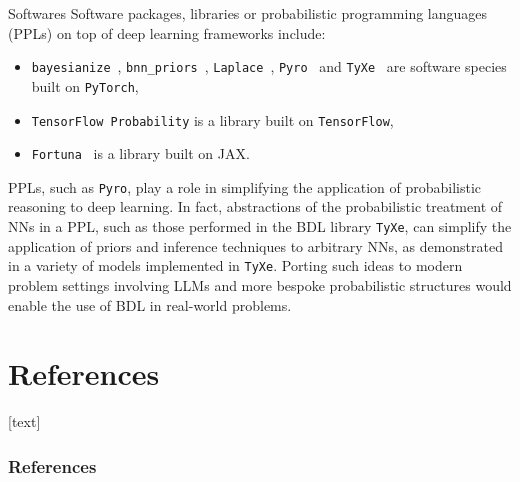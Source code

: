 \documentclass[9pt,handout]{beamer}
\begin{document}

\begin{frame}{Softwares}
Software packages, libraries or probabilistic programming languages (PPLs) on top of deep learning frameworks include:
\begin{itemize}
	\item \texttt{bayesianize}~\citep{ritter2021}, \texttt{bnn\_priors}~\citep{fortuin2021bnnpriors}, \texttt{Laplace}~\citep{daxberger2021b}, \texttt{Pyro}~\citep{bingham2019} and \texttt{TyXe}~\citep{ritter2022} are software species built on \texttt{PyTorch}, 
	\item \texttt{TensorFlow Probability} is a library built on \texttt{TensorFlow}, 
	\item \texttt{Fortuna}~\citep{detommaso2023fortuna} is a library built on JAX. %
\end{itemize}

PPLs, such as \texttt{Pyro}, play a role in simplifying the application of probabilistic reasoning to deep learning. In fact, abstractions of the probabilistic treatment of NNs in a PPL, such as those performed in the BDL library \texttt{TyXe}, can simplify the application of priors and inference techniques to arbitrary NNs, as demonstrated in a variety of models implemented in \texttt{TyXe}. Porting such ideas to modern problem settings involving LLMs and more bespoke probabilistic structures would enable the use of BDL in real-world problems. %
\end{frame}



\section*{References}
[text]%
\begin{frame}[allowframebreaks]
\frametitle{References}
\small


\normalsize
\end{frame}
\end{document}

